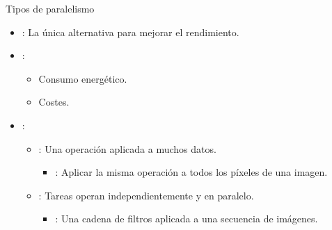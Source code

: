 \begin{frame}[t]{Tipos de paralelismo}
\begin{itemize}
  \item {}: La única alternativa para mejorar el rendimiento.

  \item {}:
    \begin{itemize}
      \item Consumo energético.
      \item Costes.
    \end{itemize}

  \item {}:
    \begin{itemize}
      \item {}: Una operación aplicada a muchos datos.
        \begin{itemize}
          \item {}: Aplicar la misma operación a todos los píxeles de una imagen.
        \end{itemize}

      \item {}: Tareas operan independientemente y en paralelo.
        \begin{itemize}
          \item {}: Una cadena de filtros aplicada a una secuencia de imágenes.
        \end{itemize}
    \end{itemize}
\end{itemize}
\end{frame}

